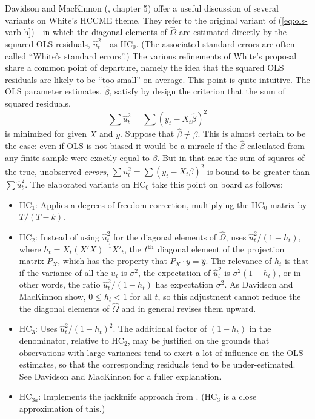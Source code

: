 Davidson and MacKinnon (\citeyear{davidson-mackinnon04}, chapter 5)
offer a useful discussion of several variants on White's HCCME
theme. They refer to the original variant of
(\ref{eq:ols-varb-h})---in which the diagonal elements of
$\hat{\Omega}$ are estimated directly by the squared OLS residuals,
$\hat{u}^2_t$---as HC$_0$.  (The associated standard errors are often
called ``White's standard errors''.)  The various refinements of
White's proposal share a common point of departure, namely the idea
that the squared OLS residuals are likely to be ``too small'' on
average.  This point is quite intuitive.  The OLS parameter estimates,
$\hat{\beta}$, satisfy by design the criterion that the sum of squared
residuals,
%
\[
\sum \hat{u}^2_t = \sum \left( y_t - X_t \hat{\beta} \right)^2
\]
%
is minimized for given $X$ and $y$.  Suppose that $\hat{\beta} \neq
\beta$.  This is almost certain to be the case: even if OLS is not
biased it would be a miracle if the $\hat{\beta}$ calculated from any
finite sample were exactly equal to $\beta$.  But in that case the sum
of squares of the true, unobserved \textit{errors}, $\sum u^2_t = \sum
(y_t - X_t \beta)^2$ is bound to be greater than $\sum \hat{u}^2_t$.
The elaborated variants on HC$_0$ take this point on board as follows:
%
\begin{itemize}
\item HC$_1$: Applies a degrees-of-freedom correction, multiplying the
  HC$_0$ matrix by $T/(T-k)$.
\item HC$_2$: Instead of using $\hat{u}^2_t$ for the diagonal elements
  of $\hat{\Omega}$, uses $\hat{u}^2_t/(1-h_t)$, where
  $h_t = X_t(X'X)^{-1}X'_t$, the $t^{\rm th}$ diagonal element of the
  projection matrix $P_X$, which has the property that
  $P_X\cdot y = \hat{y}$.  The relevance of $h_t$ is that if the
  variance of all the $u_t$ is $\sigma^2$, the expectation of
  $\hat{u}^2_t$ is $\sigma^2(1-h_t)$, or in other words, the ratio
  $\hat{u}^2_t/(1-h_t)$ has expectation $\sigma^2$.  As Davidson and
  MacKinnon show, $0\leq h_t <1$ for all $t$, so this adjustment
  cannot reduce the the diagonal elements of $\hat{\Omega}$ and in
  general revises them upward.
\item HC$_3$: Uses $\hat{u}^2_t/(1-h_t)^2$.  The additional factor of
  $(1-h_t)$ in the denominator, relative to HC$_2$, may be justified
  on the grounds that observations with large variances tend to exert
  a lot of influence on the OLS estimates, so that the corresponding
  residuals tend to be under-estimated.  See Davidson and MacKinnon
  for a fuller explanation.
\item HC$_{3a}$: Implements the jackknife approach from
  \cite{mackinnon-white85}. (HC$_3$ is a close approximation of this.)
\end{itemize}


